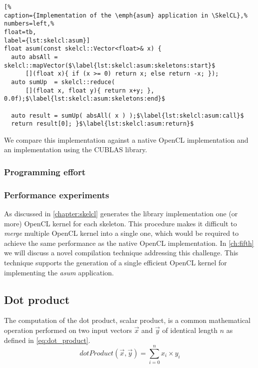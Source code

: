 \begin{lstlisting}[%                                                             
caption={Implementation of the \emph{asum} application in \SkelCL},%
numbers=left,%
float=tb,
label={lst:skelcl:asum}]
float asum(const skelcl::Vector<float>& x) {
  auto absAll = skelcl::mapVector($\label{lst:skelcl:asum:skeletons:start}$
      [](float x){ if (x >= 0) return x; else return -x; });
  auto sumUp  = skelcl::reduce(
      [](float x, float y){ return x+y; }, 0.0f);$\label{lst:skelcl:asum:skeletons:end}$

  auto result = sumUp( absAll( x ) );$\label{lst:skelcl:asum:call}$
  return result[0]; }$\label{lst:skelcl:asum:return}$
\end{lstlisting}

We compare this implementation against a native OpenCL implementation and an implementation using the CUBLAS library.

\subsubsection*{Programming effort}

\subsubsection*{Performance experiments}

As discussed in \autoref{chapter:skelcl} generates the \SkelCL library implementation one (or more) OpenCL kernel for each skeleton.
This procedure makes it difficult to \emph{merge} multiple OpenCL kernel into a single one, which would be required to achieve the same performance as the native OpenCL implementation.
In \autoref{ch:fifth} we will discuss a novel compilation technique addressing this challenge.
This technique supports the generation of a single efficient OpenCL kernel for implementing the \emph{asum} application.

\subsection{Dot product}
\label{sec:dot}
The computation of the dot product, \aka scalar product, is a common mathematical operation performed on two input vectors $\vec{x}$ and $\vec{y}$ of identical length $n$ as defined in \autoref{eq:dot_product}.
\begin{equation}
  dotProduct(\vec{x}, \vec{y}) = \sum_{i=0}^{n} x_i \times y_i
  \label{eq:dot_product}
\end{equation}

